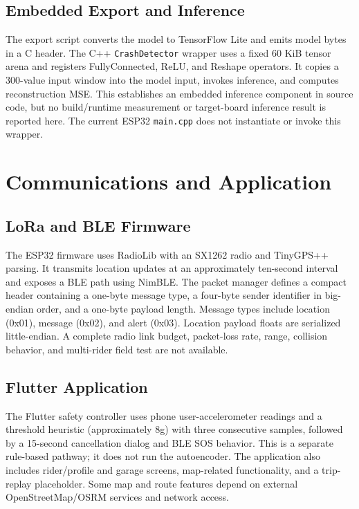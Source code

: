 \documentclass[conference]{IEEEtran}
\begin{document}
\subsection{Embedded Export and Inference}
The export script converts the model to TensorFlow Lite and emits model bytes in a C header. The C++ \texttt{CrashDetector} wrapper uses a fixed 60 KiB tensor arena and registers FullyConnected, ReLU, and Reshape operators. It copies a 300-value input window into the model input, invokes inference, and computes reconstruction MSE. This establishes an embedded inference component in source code, but no build/runtime measurement or target-board inference result is reported here. The current ESP32 \texttt{main.cpp} does not instantiate or invoke this wrapper.

\section{Communications and Application}
\subsection{LoRa and BLE Firmware}
The ESP32 firmware uses RadioLib with an SX1262 radio and TinyGPS++ parsing. It transmits location updates at an approximately ten-second interval and exposes a BLE path using NimBLE. The packet manager defines a compact header containing a one-byte message type, a four-byte sender identifier in big-endian order, and a one-byte payload length. Message types include location (0x01), message (0x02), and alert (0x03). Location payload floats are serialized little-endian. A complete radio link budget, packet-loss rate, range, collision behavior, and multi-rider field test are not available.

\subsection{Flutter Application}
The Flutter safety controller uses phone user-accelerometer readings and a threshold heuristic (approximately 8g) with three consecutive samples, followed by a 15-second cancellation dialog and BLE SOS behavior. This is a separate rule-based pathway; it does not run the autoencoder. The application also includes rider/profile and garage screens, map-related functionality, and a trip-replay placeholder. Some map and route features depend on external OpenStreetMap/OSRM services and network access.
\end{document}
